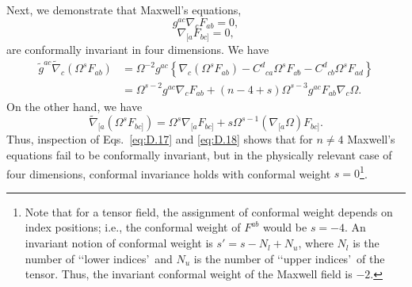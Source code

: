 Next, we demonstrate that Maxwell's equations,
\begin{equation}
  g^{ac}\nabla_cF_{ab}=0,
  \tag{D.15}\label{eq:D.15}
\end{equation}
\begin{equation}
  \nabla_{[a}F_{bc]}=0,
  \tag{D.16}\label{eq:D.16}
\end{equation}
are conformally invariant in four dimensions. We have
\begin{equation}
\begin{aligned}
  \widetilde g^{ac}\widetilde\nabla_c(\Omega^sF_{ab})
  &=\Omega^{-2}g^{ac}\left\{
  \nabla_c(\Omega^sF_{ab})-C^d{}_{ca}\Omega^sF_{\dd b}
  -C^d{}_{cb}\Omega^sF_{ad}\right\}\\
  &=\Omega^{s-2}g^{ac}\nabla_cF_{ab}
  +(n-4+s)\Omega^{s-3}g^{ac}F_{ab}\nabla_c\Omega.
\end{aligned}
  \tag{D.17}\label{eq:D.17}
\end{equation}
On the other hand, we have
\begin{equation}
  \widetilde\nabla_{[a}(\Omega^sF_{bc]})
  =\Omega^s\nabla_{[a}F_{bc]}
  +s\Omega^{s-1}(\nabla_{[a}\Omega)F_{bc]}.
  \tag{D.18}\label{eq:D.18}
\end{equation}
Thus, inspection of Eqs.~\eqref{eq:D.17} and \eqref{eq:D.18} shows that for
\(n\ne4\) Maxwell's equations fail to be conformally invariant, but in the
physically relevant case of four dimensions, conformal invariance holds with
conformal weight \(s=0\)\footnote{Note that for a tensor field, the assignment of
conformal weight depends on index positions; i.e., the conformal weight of \(F^{ab}\)
would be \(s=-4\). An invariant notion of conformal weight is
\(s'=s-N_l+N_u\), where \(N_l\) is the number of \lq\lq lower indices\rq\ and
\(N_u\) is the number of \lq\lq upper indices\rq\ of the tensor. Thus, the invariant
conformal weight of the Maxwell field is \(-2\).}.

